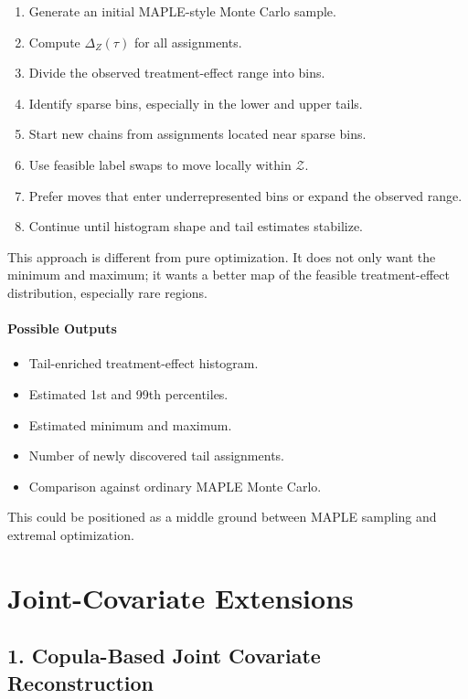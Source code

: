 \documentclass[11pt]{article}
\begin{document}
\begin{enumerate}
\item Generate an initial MAPLE-style Monte Carlo sample.
\item Compute \(\Delta_Z(\tau)\) for all assignments.
\item Divide the observed treatment-effect range into bins.
\item Identify sparse bins, especially in the lower and upper tails.
\item Start new chains from assignments located near sparse bins.
\item Use feasible label swaps to move locally within \(\mathcal Z\).
\item Prefer moves that enter underrepresented bins or expand the observed range.
\item Continue until histogram shape and tail estimates stabilize.
\end{enumerate}

This approach is different from pure optimization. It does not only want the minimum and maximum; it wants a better map of the feasible treatment-effect distribution, especially rare regions.

\paragraph*{Possible Outputs}

\begin{itemize}
\item Tail-enriched treatment-effect histogram.
\item Estimated 1st and 99th percentiles.
\item Estimated minimum and maximum.
\item Number of newly discovered tail assignments.
\item Comparison against ordinary MAPLE Monte Carlo.
\end{itemize}

This could be positioned as a middle ground between MAPLE sampling and extremal optimization.

\section{Joint-Covariate Extensions}

\subsection*{1. Copula-Based Joint Covariate Reconstruction}
\end{document}
